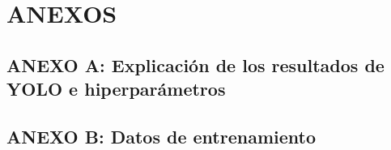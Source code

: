 \section{ANEXOS}
\subsection*{ANEXO A: Explicación de los resultados de YOLO e hiperparámetros}

\subsection*{ANEXO B: Datos de entrenamiento}
